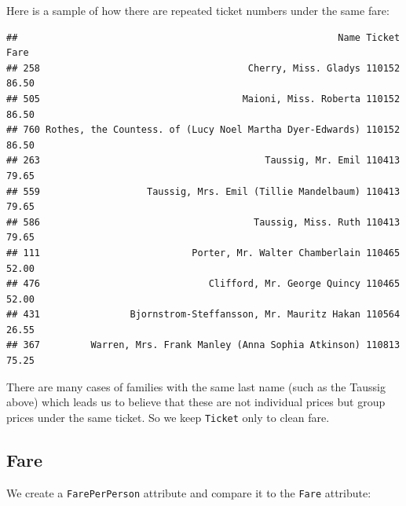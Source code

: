 \documentclass[]{article}
\newenvironment{Shaded}{\begin{snugshade}}{\end{snugshade}}
\newcommand{\KeywordTok}[1]{\textcolor[rgb]{0.13,0.29,0.53}{\textbf{#1}}}
\newcommand{\DecValTok}[1]{\textcolor[rgb]{0.00,0.00,0.81}{#1}}
\newcommand{\StringTok}[1]{\textcolor[rgb]{0.31,0.60,0.02}{#1}}
\newcommand{\CommentTok}[1]{\textcolor[rgb]{0.56,0.35,0.01}{\textit{#1}}}
\newcommand{\OperatorTok}[1]{\textcolor[rgb]{0.81,0.36,0.00}{\textbf{#1}}}
\newcommand{\NormalTok}[1]{#1}
\begin{document}
Here is a sample of how there are repeated ticket numbers under the same
fare:

\begin{Shaded}
\end{Shaded}

\begin{verbatim}
##                                                         Name Ticket  Fare
## 258                                     Cherry, Miss. Gladys 110152 86.50
## 505                                    Maioni, Miss. Roberta 110152 86.50
## 760 Rothes, the Countess. of (Lucy Noel Martha Dyer-Edwards) 110152 86.50
## 263                                        Taussig, Mr. Emil 110413 79.65
## 559                   Taussig, Mrs. Emil (Tillie Mandelbaum) 110413 79.65
## 586                                      Taussig, Miss. Ruth 110413 79.65
## 111                           Porter, Mr. Walter Chamberlain 110465 52.00
## 476                              Clifford, Mr. George Quincy 110465 52.00
## 431                Bjornstrom-Steffansson, Mr. Mauritz Hakan 110564 26.55
## 367         Warren, Mrs. Frank Manley (Anna Sophia Atkinson) 110813 75.25
\end{verbatim}

There are many cases of families with the same last name (such as the
Taussig above) which leads us to believe that these are not individual
prices but group prices under the same ticket. So we keep
\texttt{Ticket} only to clean fare.

\subsection{Fare}\label{fare}

We create a \texttt{FarePerPerson} attribute and compare it to the
\texttt{Fare} attribute:
\end{document}
